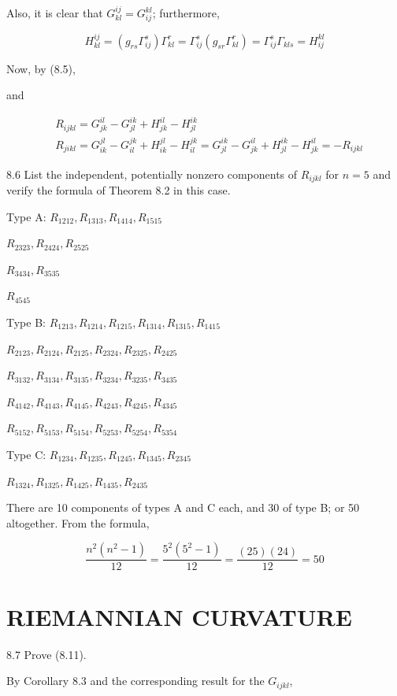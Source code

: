 \documentclass[10pt]{article}
\begin{document}
Also, it is clear that $G_{k l}^{i j}=G_{i j}^{k l}$; furthermore,

$$
H_{k l}^{i j}=\left(g_{r s} \Gamma_{i j}^{s}\right) \Gamma_{k l}^{r}=\Gamma_{i j}^{s}\left(g_{s r} \Gamma_{k l}^{r}\right)=\Gamma_{i j}^{s} \Gamma_{k l s}=H_{i j}^{k l}
$$

Now, by (8.5),

and

$$
\begin{aligned}
& R_{i j k l}=G_{j k}^{i l}-G_{j l}^{i k}+H_{j k}^{i l}-H_{j l}^{i k} \\
& R_{j i k l}=G_{i k}^{j l}-G_{i l}^{j k}+H_{i k}^{j l}-H_{i l}^{j k}=G_{j l}^{i k}-G_{j k}^{i l}+H_{j l}^{i k}-H_{j k}^{i l}=-R_{i j k l}
\end{aligned}
$$

8.6 List the independent, potentially nonzero components of $R_{i j k l}$ for $n=5$ and verify the formula of Theorem 8.2 in this case.

Type A: $R_{1212}, R_{1313}, R_{1414}, R_{1515}$

$R_{2323}, R_{2424}, R_{2525}$

$R_{3434}, R_{3535}$

$R_{4545}$

Type B: $R_{1213}, R_{1214}, R_{1215}, R_{1314}, R_{1315}, R_{1415}$

$R_{2123}, R_{2124}, R_{2125}, R_{2324}, R_{2325}, R_{2425}$

$R_{3132}, R_{3134}, R_{3135}, R_{3234}, R_{3235}, R_{3435}$

$R_{4142}, R_{4143}, R_{4145}, R_{4243}, R_{4245}, R_{4345}$

$R_{5152}, R_{5153}, R_{5154}, R_{5253}, R_{5254}, R_{5354}$

Type C: $R_{1234}, R_{1235}, R_{1245}, R_{1345}, R_{2345}$

$R_{1324}, R_{1325}, R_{1425}, R_{1435}, R_{2435}$

There are 10 components of types $\mathrm{A}$ and $\mathrm{C}$ each, and 30 of type B; or 50 altogether. From the formula,

$$
\frac{n^{2}\left(n^{2}-1\right)}{12}=\frac{5^{2}\left(5^{2}-1\right)}{12}=\frac{(25)(24)}{12}=50
$$

\section*{RIEMANNIAN CURVATURE}
8.7 Prove (8.11).

By Corollary 8.3 and the corresponding result for the $G_{i j k l}$,
\end{document}
